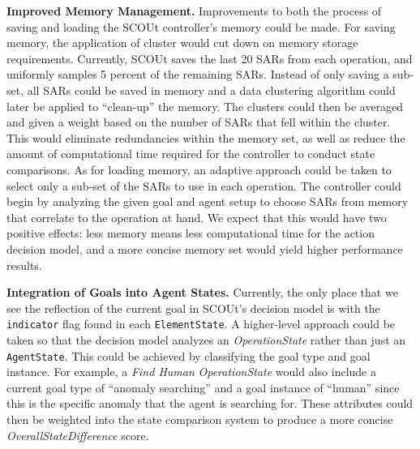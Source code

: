 \noindent
\textbf{Improved Memory Management.}
Improvements to both the process of saving and loading the SCOUt controller's memory could be made.
For saving memory, the application of cluster would cut down on memory storage requirements.
Currently, SCOUt saves the last 20 SARs from each operation, and uniformly samples 5 percent of the remaining SARs.
Instead of only saving a sub-set, all SARs could be saved in memory and a data clustering algorithm could later be applied to ``clean-up'' the memory.
The clusters could then be averaged and given a weight based on the number of SARs that fell within the cluster.
This would eliminate redundancies within the memory set, as well as reduce the amount of computational time required for the controller to conduct state comparisons.
As for loading memory, an adaptive approach could be taken to select only a sub-set of the SARs to use in each operation.
The controller could begin by analyzing the given goal and agent setup to choose SARs from memory that correlate to the operation at hand.
We expect that this would have two positive effects: less memory means less computational time for the action decision model, and a more concise memory set would yield higher performance results.

\noindent
\textbf{Integration of Goals into Agent States.}
Currently, the only place that we see the reflection of the current goal in SCOUt's decision model is with the \texttt{indicator} flag found in each \texttt{ElementState}.
A higher-level approach could be taken so that the decision model analyzes an \textit{OperationState} rather than just an \texttt{AgentState}.
This could be achieved by classifying the goal type and goal instance.
For example, a \textit{Find Human} \textit{OperationState} would also include a current goal type of ``anomaly searching'' and a goal instance of ``human'' since this is the specific anomaly that the agent is searching for.
These attributes could then be weighted into the state comparison system to produce a more concise \textit{OverallStateDifference} score.

